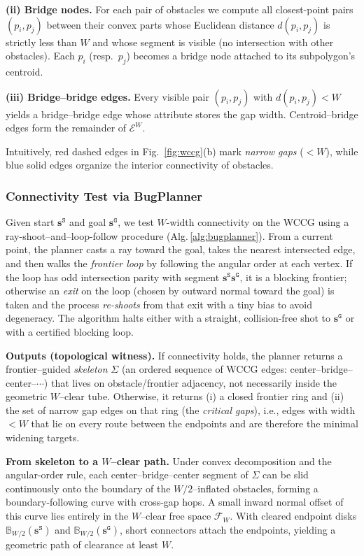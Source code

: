 \textbf{(ii) Bridge nodes.} For each pair of obstacles we compute all
  closest-point pairs $(p_i,p_j)$ between their convex parts whose Euclidean
  distance $d(p_i,p_j)$ is strictly less than $W$ and whose segment is visible
  (no intersection with other obstacles). Each $p_i$ (resp.\ $p_j$) becomes a
  bridge node attached to its subpolygon’s centroid.

\textbf{(iii) Bridge–bridge edges.} Every visible pair $(p_i,p_j)$ with
  $d(p_i,p_j)<W$ yields a bridge–bridge edge whose attribute stores the gap
  width. Centroid–bridge edges form the remainder of $\mathcal{E}^{W}$.

Intuitively, red dashed edges in Fig.~\ref{fig:wccg}(b) mark \emph{narrow
gaps} ($<W$), while blue solid edges organize the interior connectivity of
obstacles.
\subsubsection{Connectivity Test via BugPlanner}
\label{subsubsec:bugplanner-connectivity}
Given start $\mathbf{s}^{\texttt{S}}$ and goal $\mathbf{s}^{\texttt{G}}$, 
we test $W$-width connectivity on the WCCG using a ray-shoot–and–loop-follow procedure 
(Alg.\,\ref{alg:bugplanner}). From a current point, the planner casts a ray toward the goal, 
takes the nearest intersected edge, and then walks the \emph{frontier loop} 
by following the angular order at each vertex. 
If the loop has odd intersection parity with segment $\mathbf{s}^{\texttt{S}}\mathbf{s}^{\texttt{G}}$, 
it is a blocking frontier; 
otherwise an \emph{exit} on the loop (chosen by outward normal toward the goal) 
is taken and the process \emph{re-shoots} from that exit with a tiny bias to avoid degeneracy. 
The algorithm halts either with a straight, collision-free shot to $\mathbf{s}^{\texttt{G}}$ or with a certified blocking loop.

\noindent\textbf{Outputs (topological witness).}
If connectivity holds, the planner returns a frontier–guided \emph{skeleton} $\Sigma$ (an ordered sequence of WCCG edges: center–bridge–center–$\cdots$) that lives on obstacle/frontier adjacency, not necessarily inside the geometric $W$–clear tube. Otherwise, it returns (i) a closed frontier ring and (ii) the set of narrow gap edges on that ring (the \emph{critical gaps}), i.e., edges with width $<W$ that lie on every route between the endpoints and are therefore the minimal widening targets.

\noindent\textbf{From skeleton to a $W$–clear path.}
Under convex decomposition and the angular-order rule, each center–bridge–center segment of $\Sigma$ can be slid continuously onto the boundary of the $W/2$–inflated obstacles, forming a boundary-following curve with cross-gap hops. A small inward normal offset of this curve lies entirely in the $W$–clear free space $\mathcal F_W$. With cleared endpoint disks $\mathbb{B}_{W/2}(\mathbf{s}^{\texttt{S}})$ and $\mathbb{B}_{W/2}(\mathbf{s}^{\texttt{G}})$, short connectors attach the endpoints, yielding a geometric path of clearance at least $W$.

